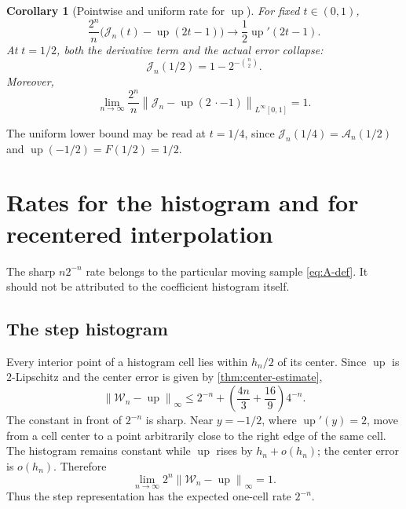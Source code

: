 \documentclass[11pt,oneside]{article}
\newtheorem{corollary}[theorem]{Corollary}
\theoremstyle{definition}
\theoremstyle{remark}
\newcommand{\Up}{\operatorname{up}}
\newcommand{\norm}[1]{\left\lVert #1\right\rVert}
\begin{document}
\begin{corollary}[Pointwise and uniform rate for $\Up$]
\label{cor:up-rate}
For fixed $t\in(0,1)$,
\begin{equation}
 \frac{2^n}{n}
 \bigl(\mathcal J_n(t)-\Up(2t-1)\bigr)
 \longrightarrow\frac12\Up'(2t-1).                       \label{eq:up-pointwise-rate}
\end{equation}
At $t=1/2$, both the derivative term and the actual error collapse:
\begin{equation}
 \mathcal J_n(1/2)=1-2^{-\binom n2}.                       \label{eq:J-half}
\end{equation}
Moreover,
\begin{equation}
 \lim_{n\to\infty}\frac{2^n}{n}
 \norm{\mathcal J_n-\Up(2\,\cdot-1)}_{L^\infty[0,1]}=1.  \label{eq:up-uniform-rate}
\end{equation}
\end{corollary}

The uniform lower bound may be read at $t=1/4$, since
$\mathcal J_n(1/4)=\mathcal A_n(1/2)$ and
$\Up(-1/2)=F(1/2)=1/2$.

\section{Rates for the histogram and for recentered interpolation}
\label{sec:other-rates}

The sharp $n2^{-n}$ rate belongs to the particular moving sample
\eqref{eq:A-def}.  It should not be attributed to the coefficient histogram
itself.

\subsection{The step histogram}

Every interior point of a histogram cell lies within $h_n/2$ of its center.
Since $\Up$ is $2$-Lipschitz and the center error is given by
\cref{thm:center-estimate},
\begin{equation}
 \norm{\mathcal W_n-\Up}_\infty
 \le 2^{-n}+
 \left(\frac{4n}{3}+\frac{16}{9}\right)4^{-n}.             \label{eq:histogram-upper}
\end{equation}
The constant in front of $2^{-n}$ is sharp.  Near $y=-1/2$, where
$\Up'(y)=2$, move from a cell center to a point arbitrarily close to the right
edge of the same cell.  The histogram remains constant while $\Up$ rises by
$h_n+o(h_n)$; the center error is $o(h_n)$.  Therefore
\begin{equation}
 \boxed{\displaystyle
 \lim_{n\to\infty}2^n\norm{\mathcal W_n-\Up}_\infty=1.}   \label{eq:histogram-sharp}
\end{equation}
Thus the step representation has the expected one-cell rate $2^{-n}$.
\end{document}
